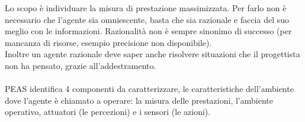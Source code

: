 \documentclass[10pt,a4paper]{book}
\begin{document}
Lo scopo \`e individuare la misura di prestazione massimizzata. Per farlo non \`e necessario che l'agente sia omniescente, basta che sia razionale e faccia del suo meglio con le informazioni. Razionalit\`a non \`e sempre sinonimo di successo (per mancanza di risorse, esempio precisione non disponibile).\\
Inoltre un agente razionale deve saper anche risolvere situazioni che il progettista non ha pensato, grazie all'addestramento.\\
\\
PEAS identifica 4 componenti da caratterizzare, le caratteristiche dell'ambiente dove l'agente \`e chiamato a operare: la misura delle prestazioni, l'ambiente operativo, attuatori (le percezioni) e i sensori (le azioni). 
\end{document}
